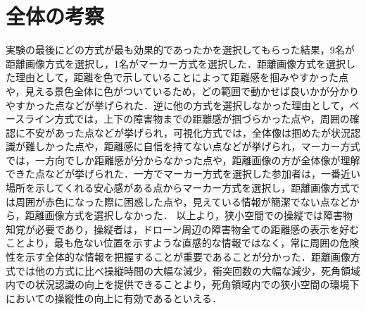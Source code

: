 \documentclass
[a4paper,11pt]{jreport}
\begin{document}
\section{全体の考察}
実験の最後にどの方式が最も効果的であったかを選択してもらった結果，9名が距離画像方式を選択し，1名がマーカー方式を選択した．距離画像方式を選択した理由として，距離を色で示していることによって距離感を掴みやすかった点や，見える景色全体に色がついているため，どの範囲で動かせば良いかが分かりやすかった点などが挙げられた．逆に他の方式を選択しなかった理由として，ベースライン方式では，上下の障害物までの距離感が掴づらかった点や，周囲の確認に不安があった点などが挙げられ，可視化方式では，全体像は掴めたが状況認識が難しかった点や，距離感に自信を持てない点などが挙げられ，マーカー方式では，一方向でしか距離感が分からなかった点や，距離画像の方が全体像が理解できた点などが挙げられた．一方でマーカー方式を選択した参加者は，一番近い場所を示してくれる安心感がある点からマーカー方式を選択し，距離画像方式では周囲が赤色になった際に困惑した点や，見えている情報が簡潔でない点などから，距離画像方式を選択しなかった．
以上より，狭小空間での操縦では障害物知覚が必要であり，操縦者は，ドローン周辺の障害物全ての距離感の表示を好むことより，最も危ない位置を示すような直感的な情報ではなく，常に周囲の危険性を示す全体的な情報を把握することが重要であることが分かった．距離画像方式では他の方式に比べ操縦時間の大幅な減少，衝突回数の大幅な減少，死角領域内での状況認識の向上を提供できることより，死角領域内での狭小空間の環境下においての操縦性の向上に有効であるといえる．








\end{document}
